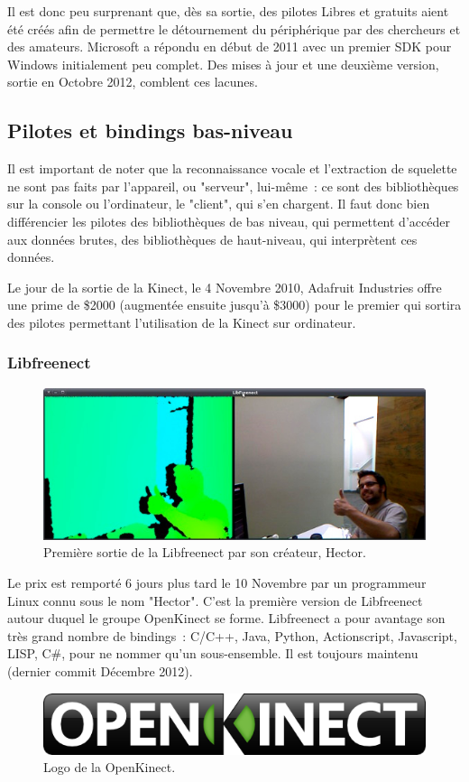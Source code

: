 Il est donc peu surprenant que, dès sa sortie, des pilotes Libres et gratuits
aient été créés afin de permettre le détournement du périphérique par des
chercheurs et des amateurs. Microsoft a répondu en début de 2011 avec un
premier SDK pour Windows initialement peu complet. Des mises à jour et une
deuxième version, sortie en Octobre 2012, comblent ces lacunes\cite{wiki_kinect}.

\subsection{Pilotes et bindings bas-niveau}

Il est important de noter que la reconnaissance vocale et l'extraction de 
squelette ne sont pas faits par l'appareil, ou "serveur", lui-même~: ce sont des
bibliothèques sur la console ou l'ordinateur, le "client", qui s'en chargent. 
Il faut donc bien
différencier les pilotes des bibliothèques de bas niveau, qui permettent 
d'accéder aux données brutes, des
bibliothèques de haut-niveau, qui interprètent ces données.

Le jour de la sortie de la Kinect, le 4 Novembre 2010, Adafruit Industries 
offre une prime de \$2000 (augmentée ensuite jusqu'à \$3000) pour le premier qui
sortira des pilotes permettant l'utilisation de la Kinect sur ordinateur\cite{adafruit_bounty}.

\subsubsection{Libfreenect}
\begin{figure}[h!]
\centering
\includegraphics[width=\linewidth]{images/hector}
\caption{Première sortie de la Libfreenect par son créateur, Hector.}
\end{figure}
Le prix est remporté 6 jours plus tard le 10 Novembre par un programmeur Linux
connu sous le nom "Hector"\cite{adafruit_winner}. C'est la première version de Libfreenect autour
duquel le groupe OpenKinect se forme. Libfreenect a pour avantage son
très grand nombre de bindings~: C/C++, Java, Python, Actionscript, Javascript,
LISP, C\#, pour ne nommer qu'un sous-ensemble. 
Il est toujours maintenu (dernier commit Décembre 2012).
\begin{figure}[h!]
\centering
\includegraphics[width=0.5\linewidth]{images/openkinect_logo}
\caption{Logo de la OpenKinect.}
\end{figure}


